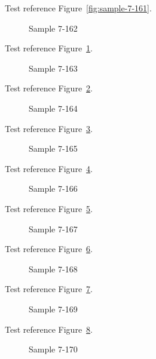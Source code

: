 Test reference Figure~\ref{fig:sample-7-161}.

\begin{figure}[tbhp]
\caption{Sample 7-162}
\label{fig:sample-7-162}
\end{figure}

Test reference Figure~\ref{fig:sample-7-162}.

\begin{figure}[tbhp]
\caption{Sample 7-163}
\label{fig:sample-7-163}
\end{figure}

Test reference Figure~\ref{fig:sample-7-163}.

\begin{figure}[tbhp]
\caption{Sample 7-164}
\label{fig:sample-7-164}
\end{figure}

Test reference Figure~\ref{fig:sample-7-164}.

\begin{figure}[tbhp]
\caption{Sample 7-165}
\label{fig:sample-7-165}
\end{figure}

Test reference Figure~\ref{fig:sample-7-165}.

\begin{figure}[tbhp]
\caption{Sample 7-166}
\label{fig:sample-7-166}
\end{figure}

Test reference Figure~\ref{fig:sample-7-166}.

\begin{figure}[tbhp]
\caption{Sample 7-167}
\label{fig:sample-7-167}
\end{figure}

Test reference Figure~\ref{fig:sample-7-167}.

\begin{figure}[tbhp]
\caption{Sample 7-168}
\label{fig:sample-7-168}
\end{figure}

Test reference Figure~\ref{fig:sample-7-168}.

\begin{figure}[tbhp]
\caption{Sample 7-169}
\label{fig:sample-7-169}
\end{figure}

Test reference Figure~\ref{fig:sample-7-169}.

\begin{figure}[tbhp]
\caption{Sample 7-170}
\label{fig:sample-7-170}
\end{figure}

